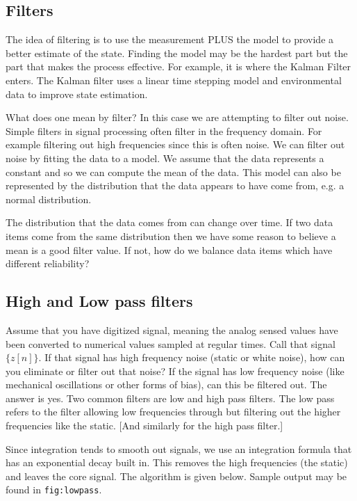 \hypertarget{filters}{%
\subsection{Filters}\label{filters}}

The idea of filtering is to use the measurement PLUS the model to
provide a better estimate of the state. Finding the model may be the
hardest part but the part that makes the process effective. For example,
it is where the Kalman Filter enters. The Kalman filter uses a linear
time stepping model and environmental data to improve state estimation.

What does one mean by filter? In this case we are attempting to filter
out noise. Simple filters in signal processing often filter in the
frequency domain. For example filtering out high frequencies since this
is often noise. We can filter out noise by fitting the data to a model.
We assume that the data represents a constant and so we can compute the
mean of the data. This model can also be represented by the distribution
that the data appears to have come from, e.g. a normal distribution.

The distribution that the data comes from can change over time. If two
data items come from the same distribution then we have some reason to
believe a mean is a good filter value. If not, how do we balance data
items which have different reliability?

\hypertarget{high-and-low-pass-filters}{%
\subsection{High and Low pass filters}\label{high-and-low-pass-filters}}

Assume that you have digitized signal, meaning the analog sensed values
have been converted to numerical values sampled at regular times. Call
that signal \(\{ z[n]\}\). If that signal has high frequency noise
(static or white noise), how can you eliminate or filter out that noise?
If the signal has low frequency noise (like mechanical oscillations or
other forms of bias), can this be filtered out. The answer is yes. Two
common filters are low and high pass filters. The low pass refers to the
filter allowing low frequencies through but filtering out the higher
frequencies like the static. {[}And similarly for the high pass
filter.{]}

Since integration tends to smooth out signals, we use an integration
formula that has an exponential decay built in. This removes the high
frequencies (the static) and leaves the core signal. The algorithm is
given below. Sample output may be found in \texttt{fig:lowpass}.

